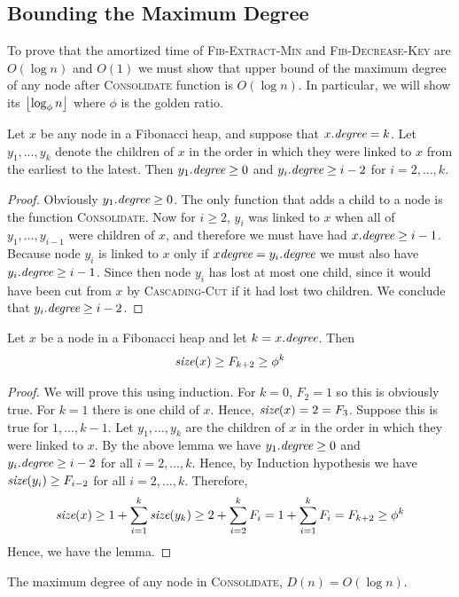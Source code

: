 \subsection{Bounding the Maximum Degree}\label{max-degree-bound}
To prove that the amortized time of \textsc{Fib-Extract-Min} and \textsc{Fib-Decrease-Key} are $O(\log n)$  and $O(1)$ we must show that upper bound of the maximum degree of any node after \textsc{Consolidate} function is $O(\log n)$. In particular, we will show its $\left\lfloor \log_{\phi}n\right\rfloor$ where $\phi$ is the golden ratio.
\begin{lemma}{}{}
	Let $x$ be any node in a Fibonacci heap, and suppose that $x.\emph{degree}=k$. Let $y_1,\dots, y_k$ denote the children of $x$ in the order in which they were linked to $x$ from the earliest to the latest. Then $y_1.\emph{degree}\geq 0$ and $y_i.\emph{degree}\geq i-2$ for $i=2,\dots, k$.
\end{lemma}
\begin{proof}
	Obviously $y_1.\emph{degree}\geq 0$. The only function that adds a child to a node is the function \textsc{Consolidate}. Now for $i\geq 2$, $y_i$ was linked to $x$ when all of $y_1,\dots, y_{i-1}$ were children of $x$, and therefore we must have had $x.\emph{degree}\geq i-1$. Because node $y_i$ is linked to $x$ only if $x\emph{degree}=y_i.\emph{degree}$ we must also have $y_i.\emph{degree}\geq i-1$. Since then node $y_i$ has lost at most one child, since it would have been cut from $x$ by \textsc{Cascading-Cut} if it had lost two children. We conclude that $y_i.\emph{degree}\geq i-2$.
\end{proof}
\begin{lemma}{}{}
	Let $x$ be a node in a Fibonacci heap and let $k=x.\emph{degree}$. Then $$\emph{size}(x)\geq F_{k+2}\geq \phi^k$$
\end{lemma}
\begin{proof}
	We will prove this using induction. For $k=0$, $F_2=1$ so this is obviously true. For $k=1$ there is one child of $x$. Hence, $\emph{size}(x)=2=F_3$. Suppose this is true for $1,\dots, k-1$. Let $y_1,\dots, y_k$ are the children of $x$  in the order in which they were linked to $x$. By the above lemma we have $y_1.\emph{degree}\geq 0$ and $y_i.\emph{degree}\geq i-2$ for all $i=2,\dots, k$. Hence, by Induction hypothesis we have $\emph{size}(y_i)\geq F_{i-2}$ for all $i=2,\dots, k$. Therefore, \[
		\emph{size}(x) \geq 1+\sum\limits_{i=1}^{k}\emph{size}(y_k)\geq 2+\sum\limits_{i=2}^kF_{i}=1+\sum\limits_{i=1}^k F_i=F_{k+2}\geq \phi^k
	\]Hence, we have the lemma.
\end{proof}
\begin{corollary}{}{}
	The maximum degree of any node in \textsc{Consolidate}, $D(n)=O(\log n)$.
\end{corollary}
